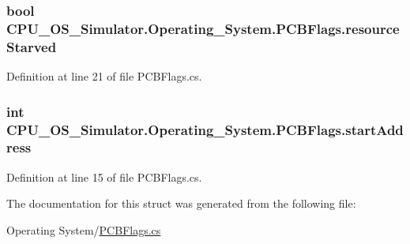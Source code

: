 \subsubsection[{resource\+Starved}]{\setlength{\rightskip}{0pt plus 5cm}bool C\+P\+U\+\_\+\+O\+S\+\_\+\+Simulator.\+Operating\+\_\+\+System.\+P\+C\+B\+Flags.\+resource\+Starved}\label{struct_c_p_u___o_s___simulator_1_1_operating___system_1_1_p_c_b_flags_ad9a23e852aa137ab0289efebb5645b19}


Definition at line 21 of file P\+C\+B\+Flags.\+cs.

\hypertarget{struct_c_p_u___o_s___simulator_1_1_operating___system_1_1_p_c_b_flags_a774bd0d595863252698e5dfc36015c50}{}
\subsubsection[{start\+Address}]{\setlength{\rightskip}{0pt plus 5cm}int C\+P\+U\+\_\+\+O\+S\+\_\+\+Simulator.\+Operating\+\_\+\+System.\+P\+C\+B\+Flags.\+start\+Address}\label{struct_c_p_u___o_s___simulator_1_1_operating___system_1_1_p_c_b_flags_a774bd0d595863252698e5dfc36015c50}


Definition at line 15 of file P\+C\+B\+Flags.\+cs.



The documentation for this struct was generated from the following file\+:\begin{DoxyCompactItemize}
\item 
Operating System/\hyperlink{_p_c_b_flags_8cs}{P\+C\+B\+Flags.\+cs}\end{DoxyCompactItemize}
